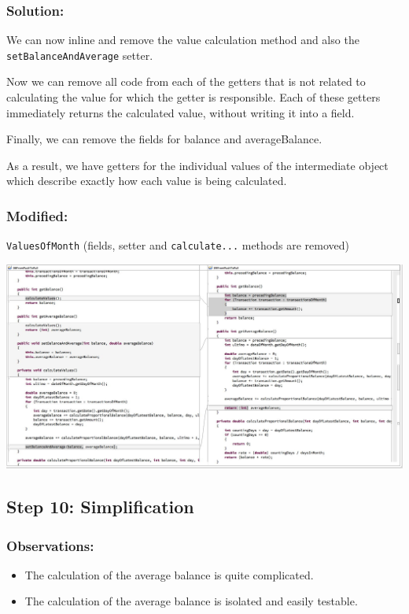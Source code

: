 \documentclass[a4paper,fleqn,titlepage,11pt]{article}
\begin{document}
\subsubsection*{Solution:}

We can now inline and remove the value calculation method and also the \texttt{setBalanceAndAverage} setter.

Now we can remove all code from each of the getters that is not related to calculating the value for which the getter is responsible. Each of these getters immediately returns the calculated value, without writing it into a field.

Finally, we can remove the fields for balance and averageBalance.

As a result, we have getters for the individual values of the intermediate object which describe exactly how each value is being calculated.

\subsubsection*{Modified:}

\texttt{ValuesOfMonth} (fields, setter and \texttt{calculate...} methods are removed)

\includegraphics[width=1\textwidth]{CompareViews/08-09.jpg}



\subsection*{Step 10: Simplification}

\subsubsection*{Observations:}
\begin{itemize}
\item The calculation of the average balance is quite complicated.
\item The calculation of the average balance is isolated and easily testable.
\end{itemize}
\end{document}

